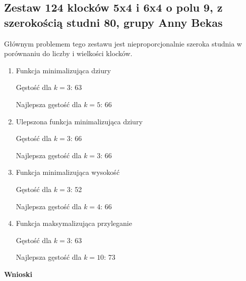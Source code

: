 \documentclass{article}
\begin{document}
\subsection{Zestaw 124 klocków 5x4 i 6x4 o polu 9, z szerokością studni 80, grupy Anny Bekas}
Głównym problemem tego zestawu jest nieproporcjonalnie szeroka studnia w porównaniu do liczby i wielkości klocków.
\begin{enumerate}

\item Funkcja minimalizująca dziury

Gęstość dla $k=3$: 63

Najlepsza gęstość dla $k=5$: 66

\item Ulepszona funkcja minimalizująca dziury

Gęstość dla $k=3$: 66

Najlepsza gęstość dla $k=3$: 66

\item Funkcja minimalizująca wysokość

Gęstość dla $k=3$: 52

Najlepsza gęstość dla $k=4$: 66

\item Funkcja maksymalizująca przyleganie

Gęstość dla $k=3$: 63

Najlepsza gęstość dla $k=10$: 73

\end{enumerate}
\textbf{Wnioski}
\end{document}
